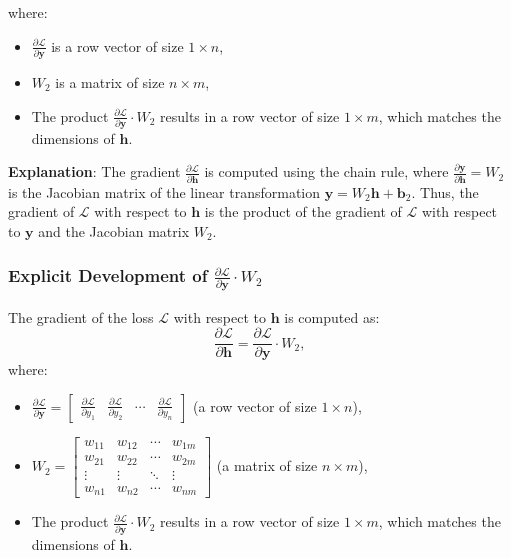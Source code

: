 \begin{notechapter}
where:
\begin{itemize}
    \item \( \frac{\partial \mathcal{L}}{\partial \mathbf{y}} \) is a row vector of size \( 1 \times n \),
    \item \( W_2 \) is a matrix of size \( n \times m \),
    \item The product \( \frac{\partial \mathcal{L}}{\partial \mathbf{y}} \cdot W_2 \) results in a row vector of size \( 1 \times m \), which matches the dimensions of \( \mathbf{h} \).
\end{itemize}

\textbf{Explanation}:
The gradient \( \frac{\partial \mathcal{L}}{\partial \mathbf{h}} \) is computed using the chain rule, where \( \frac{\partial \mathbf{y}}{\partial \mathbf{h}} = W_2 \) is the Jacobian matrix of the linear transformation \( \mathbf{y} = W_2 \mathbf{h} + \mathbf{b}_2 \). Thus, the gradient of \( \mathcal{L} \) with respect to \( \mathbf{h} \) is the product of the gradient of \( \mathcal{L} \) with respect to \( \mathbf{y} \) and the Jacobian matrix \( W_2 \).

\subsubsection{Explicit Development of \( \frac{\partial \mathcal{L}}{\partial \mathbf{y}} \cdot W_2 \)}
The gradient of the loss \( \mathcal{L} \) with respect to \( \mathbf{h} \) is computed as:
\[
\frac{\partial \mathcal{L}}{\partial \mathbf{h}} = \frac{\partial \mathcal{L}}{\partial \mathbf{y}} \cdot W_2,
\]
where:
\begin{itemize}
    \item \( \frac{\partial \mathcal{L}}{\partial \mathbf{y}} = \begin{bmatrix} 
    \frac{\partial \mathcal{L}}{\partial y_1} & \frac{\partial \mathcal{L}}{\partial y_2} 
    & \cdots & \frac{\partial \mathcal{L}}{\partial y_n} \end{bmatrix} \) 
    (a row vector of size \( 1 \times n \)),
    \item \( W_2 = \begin{bmatrix} 
    w_{11} & w_{12} & \cdots & w_{1m} \\
    w_{21} & w_{22} & \cdots & w_{2m} \\
    \vdots & \vdots & \ddots & \vdots \\
    w_{n1} & w_{n2} & \cdots & w_{nm}
    \end{bmatrix} \) (a matrix of size \( n \times m \)),
    \item The product \( \frac{\partial \mathcal{L}}{\partial \mathbf{y}} \cdot W_2 \) 
    results in a row vector of size \( 1 \times m \), which matches the dimensions of \( \mathbf{h} \).
\end{itemize}


\end{notechapter}
